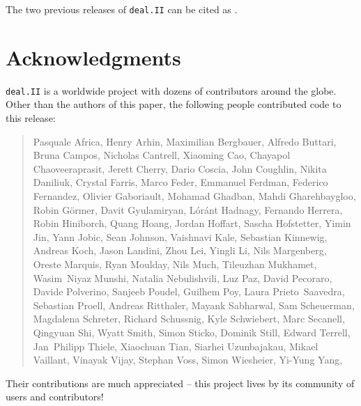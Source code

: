 \documentclass{ansarticle-preprint}
\newcommand{\specialword}[1]{\texttt{#1}}
\newcommand{\dealii}{{\specialword{deal.II}}\xspace}
\begin{document}
The two previous releases of \dealii can be cited as
\cite{dealII95,dealII96}.


\section{Acknowledgments}

\dealii is a worldwide project with dozens of contributors around the
globe. Other than the authors of this paper, the following people
contributed code to this release:\\


\begin{quote}
Pasquale     Africa,
Henry        Arhin,
Maximilian   Bergbauer,
Alfredo      Buttari,
Bruna        Campos,
Nicholas     Cantrell,
Xiaoming     Cao,
Chayapol     Chaoveeraprasit,
Jerett       Cherry,
Dario        Coscia,
John         Coughlin,
Nikita       Daniliuk,
Crystal      Farris,
Marco        Feder,
Emmanuel     Ferdman,
Federico     Fernandez,
Olivier      Gaboriault,
Mohamad      Ghadban,
Mahdi        Gharehbaygloo,
Robin        Görmer,
Davit        Gyulamiryan,
Lóránt       Hadnagy,
Fernando     Herrera,
Robin        Hiniborch,
Quang        Hoang,
Jordan       Hoffart,
Sascha       Hofstetter,
Yimin        Jin,
Yann         Jobic,
Sean         Johnson,
Vaishnavi    Kale,
Sebastian    Kinnewig,
Andreas      Koch,
Jason        Landini,
Zhou         Lei,
Yingli       Li,
Nils         Margenberg,
Oreste       Marquis,
Ryan         Moulday,
Nils         Much,
Tileuzhan    Mukhamet,
Wasim~Niyaz  Munshi,
Natalia      Nebulishvili,
Luz          Paz,
David        Pecoraro,
Davide       Polverino,
Sanjeeb      Poudel,
Guilhem      Poy,
Laura        Prieto~Saavedra,
Sebastian    Proell,
Andreas      Ritthaler,
Mayank       Sabharwal,
Sam          Scheuerman,
Magdalena    Schreter,
Richard      Schussnig,
Kyle         Schwiebert,
Marc         Secanell,
Qingyuan     Shi,
Wyatt        Smith,
Simon        Sticko,
Dominik      Still,
Edward       Terrell,
Jan~Philipp  Thiele,
Xiaochuan    Tian,
Siarhei      Uzunbajakau,
Mikael       Vaillant,
Vinayak      Vijay,
Stephan      Voss,
Simon        Wiesheier,
Yi-Yung      Yang,
\end{quote}
Their contributions are much appreciated -- this project lives by its
community of users and contributors!
\end{document}

